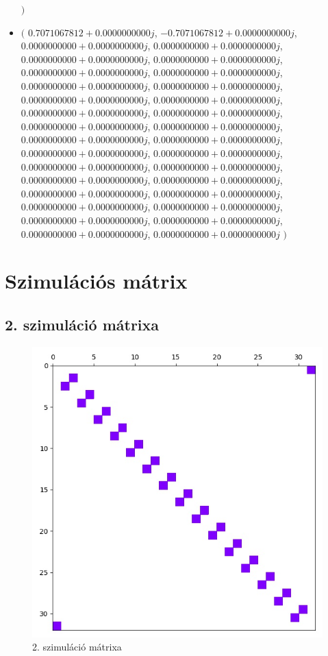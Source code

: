 \documentclass[14pt,a4paper]{article}
\begin{document}
\begin{itemize}
$\big)$
\item
$\big($
$0.7071067812+0.0000000000j$, $-0.7071067812+0.0000000000j$, $0.0000000000+0.0000000000j$, $0.0000000000+0.0000000000j$, $0.0000000000+0.0000000000j$, $0.0000000000+0.0000000000j$, $0.0000000000+0.0000000000j$, $0.0000000000+0.0000000000j$, $0.0000000000+0.0000000000j$, $0.0000000000+0.0000000000j$, $0.0000000000+0.0000000000j$, $0.0000000000+0.0000000000j$, $0.0000000000+0.0000000000j$, $0.0000000000+0.0000000000j$, $0.0000000000+0.0000000000j$, $0.0000000000+0.0000000000j$, $0.0000000000+0.0000000000j$, $0.0000000000+0.0000000000j$, $0.0000000000+0.0000000000j$, $0.0000000000+0.0000000000j$, $0.0000000000+0.0000000000j$, $0.0000000000+0.0000000000j$, $0.0000000000+0.0000000000j$, $0.0000000000+0.0000000000j$, $0.0000000000+0.0000000000j$, $0.0000000000+0.0000000000j$, $0.0000000000+0.0000000000j$, $0.0000000000+0.0000000000j$, $0.0000000000+0.0000000000j$, $0.0000000000+0.0000000000j$, $0.0000000000+0.0000000000j$, $0.0000000000+0.0000000000j$
$\big)$
\end{itemize}
\section{Szimulációs mátrix}
\subsection{2. szimuláció mátrixa}
\begin{figure}[H]
\centering
\includegraphics[width = 0.7\columnwidth]{sim_02/simulation_matrix.jpg}
\caption{2. szimuláció mátrixa}
\end{figure}
\end{document}
